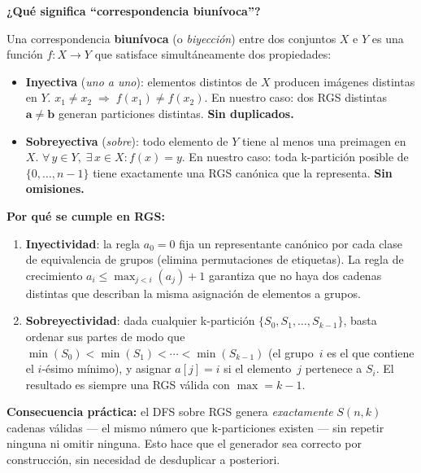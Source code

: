\documentclass[12pt,letterpaper]{article}
\theoremstyle{definition}
\theoremstyle{remark}
\newcommand{\Stir}[2]{S(#1,#2)}
\begin{document}
\begin{orangeBox}
\textbf{¿Qué significa ``correspondencia biunívoca''?}

Una correspondencia \textbf{biunívoca} (o \emph{biyección}) entre dos conjuntos $X$ e $Y$
es una función $f: X \to Y$ que satisface simultáneamente dos propiedades:

\begin{itemize}
  \item \textbf{Inyectiva} (\emph{uno a uno}): elementos distintos de $X$ producen
    imágenes distintas en $Y$.
    $x_1 \neq x_2 \;\Rightarrow\; f(x_1) \neq f(x_2)$.
    En nuestro caso: dos RGS distintas $\mathbf{a} \neq \mathbf{b}$ generan
    particiones distintas. \textbf{Sin duplicados.}

  \item \textbf{Sobreyectiva} (\emph{sobre}): todo elemento de $Y$ tiene al menos
    una preimagen en $X$.
    $\forall\, y \in Y,\; \exists\, x \in X : f(x) = y$.
    En nuestro caso: toda k-partición posible de $\{0,\ldots,n-1\}$ tiene exactamente
    una RGS canónica que la representa. \textbf{Sin omisiones.}
\end{itemize}

\medskip
\textbf{Por qué se cumple en RGS:}
\begin{enumerate}
  \item \textbf{Inyectividad}: la regla $a_0 = 0$ fija un representante canónico
    por cada clase de equivalencia de grupos (elimina permutaciones de etiquetas).
    La regla de crecimiento $a_i \leq \max_{j<i}(a_j) + 1$ garantiza que no haya
    dos cadenas distintas que describan la misma asignación de elementos a grupos.

  \item \textbf{Sobreyectividad}: dada cualquier k-partición
    $\{S_0, S_1, \ldots, S_{k-1}\}$, basta ordenar sus partes de modo que
    $\min(S_0) < \min(S_1) < \cdots < \min(S_{k-1})$ (el grupo~$i$ es el que
    contiene el $i$-ésimo mínimo), y asignar $a[j] = i$ si el elemento~$j$
    pertenece a $S_i$. El resultado es siempre una RGS válida con $\max = k-1$.
\end{enumerate}

\medskip
\textbf{Consecuencia práctica:} el DFS sobre RGS genera \emph{exactamente}
$\Stir{n}{k}$ cadenas válidas --- el mismo número que k-particiones existen ---
sin repetir ninguna ni omitir ninguna. Esto hace que el generador sea correcto
por construcción, sin necesidad de desduplicar a posteriori.
\end{orangeBox}
\end{document}

